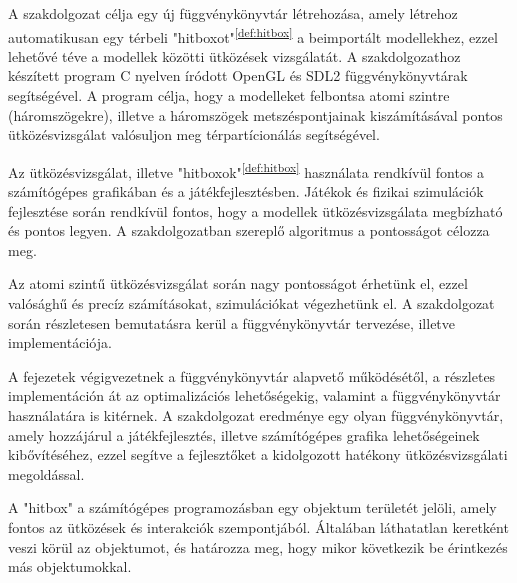 
A szakdolgozat célja egy új függvénykönyvtár létrehozása, amely létrehoz automatikusan egy térbeli "hitboxot"\textsuperscript{\ref{def:hitbox}} a beimportált modellekhez, ezzel lehetővé téve a modellek közötti ütközések vizsgálatát. A szakdolgozathoz készített program C\cite{C} nyelven íródott OpenGL\cite{OpenGL} és SDL2\cite{SDL2} függvénykönyvtárak segítségével. A program célja, hogy a modelleket felbontsa atomi szintre (háromszögekre), illetve a háromszögek metszéspontjainak kiszámításával pontos ütközésvizsgálat valósuljon meg \cite{ter}{térpartícionálás} segítségével.

Az ütközésvizsgálat, illetve "hitboxok"\textsuperscript{\ref{def:hitbox}} használata rendkívül fontos a számítógépes grafikában és a játékfejlesztésben. Játékok és fizikai szimulációk fejlesztése során rendkívül fontos, hogy a modellek ütközésvizsgálata megbízható és pontos legyen. A szakdolgozatban szereplő algoritmus a pontosságot célozza meg.

Az atomi szintű ütközésvizsgálat során nagy pontosságot érhetünk el, ezzel valósághű és precíz számításokat, szimulációkat végezhetünk el. A szakdolgozat során részletesen bemutatásra kerül a függvénykönyvtár tervezése, illetve implementációja.

A fejezetek végigvezetnek a függvénykönyvtár alapvető működésétől, a részletes implementáción át az optimalizációs lehetőségekig, valamint a függvénykönyvtár használatára is kitérnek. A szakdolgozat eredménye egy olyan függvénykönyvtár, amely hozzájárul a játékfejlesztés, illetve számítógépes grafika lehetőségeinek kibővítéséhez, ezzel segítve a fejlesztőket a kidolgozott hatékony ütközésvizsgálati megoldással.
\vfill
\begin{definition}[Hitbox]
	A "hitbox" a számítógépes programozásban egy objektum területét jelöli, amely fontos az ütközések és interakciók szempontjából. Általában láthatatlan keretként veszi körül az objektumot, és határozza meg, hogy mikor következik be érintkezés más objektumokkal. 
	\label{def:hitbox}
\end{definition}